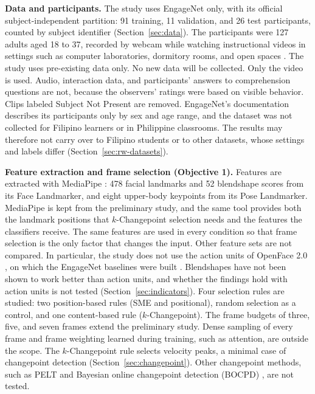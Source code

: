 \textbf{Data and participants.} The study uses EngageNet \cite{singh2023} only, with its official subject-independent partition: 91 training, 11 validation, and 26 test participants, counted by subject identifier (Section~\ref{sec:data}). The participants were 127 adults aged 18 to 37, recorded by webcam while watching instructional videos in settings such as computer laboratories, dormitory rooms, and open spaces \cite{singh2023}. The study uses pre-existing data only. No new data will be collected. Only the video is used. Audio, interaction data, and participants' answers to comprehension questions are not, because the observers' ratings were based on visible behavior. Clips labeled Subject Not Present are removed. EngageNet's documentation describes its participants only by sex and age range, and the dataset was not collected for Filipino learners or in Philippine classrooms. The results may therefore not carry over to Filipino students or to other datasets, whose settings and labels differ (Section~\ref{sec:rw-datasets}).

\textbf{Feature extraction and frame selection (Objective 1).} Features are extracted with MediaPipe \cite{lugaresi2019}: 478 facial landmarks and 52 blendshape scores from its Face Landmarker, and eight upper-body keypoints from its Pose Landmarker. MediaPipe is kept from the preliminary study, and the same tool provides both the landmark positions that $k$-Changepoint selection needs and the features the classifiers receive. The same features are used in every condition so that frame selection is the only factor that changes the input. Other feature sets are not compared. In particular, the study does not use the action units of OpenFace 2.0 \cite{baltrusaitis2018}, on which the EngageNet baselines were built \cite{singh2023}. Blendshapes have not been shown to work better than action units, and whether the findings hold with action units is not tested (Section~\ref{sec:indicators}). Four selection rules are studied: two position-based rules (SME and positional), random selection as a control, and one content-based rule ($k$-Changepoint). The frame budgets of three, five, and seven frames extend the preliminary study. Dense sampling of every frame and frame weighting learned during training, such as attention, are outside the scope. The $k$-Changepoint rule selects velocity peaks, a minimal case of changepoint detection (Section~\ref{sec:changepoint}). Other changepoint methods, such as PELT \cite{killick2012} and Bayesian online changepoint detection (BOCPD) \cite{adams2007}, are not tested.

